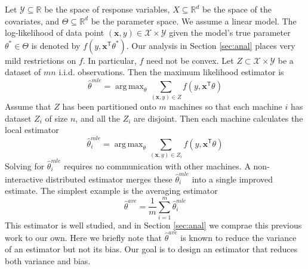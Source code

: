 \documentclass[twoside]{article}
\DeclareMathOperator*{\argmin}{arg\,min}
\DeclareMathOperator*{\argmax}{arg\,max}
\newcommand{\Q}{\mathcal{Q}}
\newcommand{\Y}{\mathcal{Y}}
\newcommand{\X}{\mathcal{X}}
\newcommand{\x}{\mathbf{x}}
\newcommand{\w}{\theta}
\newcommand{\wave}{\hat\w^{ave}}
\newcommand{\wmle}{\hat\w^{mle}}
\newcommand{\wstar}{{\w^{*}}}
\newcommand{\wq}{\hat\w^{q}}
\newcommand{\wqstar}{\hat\w^{q^*}}
\newcommand{\trans}[1]{\ensuremath{{#1}^{\mathsf{T}}}}
\newcommand{\ltwo}[1]{{\left\lVert {#1} \right\rVert}}
\begin{document}
Let $\Y\subseteq\mathbb{R}$ be the space of response variables,
$X\subseteq\mathbb{R}^d$ be the space of the covariates,
and $\Theta\subseteq\mathbb{R}^d$ be the parameter space.
We assume a linear model.
The log-likelihood of data point $(\x,y)\in\X\times\Y$ given the model's true parameter $\wstar\in\Theta$ is denoted by $f(y,\trans\x\wstar)$.
Our analysis in Section \ref{sec:anal} places very mild restrictions on $f$.
In particular, $f$ need not be convex.
Let $Z\subset\X\times\Y$ be a dataset of $mn$ i.i.d. observations.
Then the maximum likelihood estimator is
\begin{equation}
\wmle=\argmax_\w \sum_{(\x,y)\in Z} f(y,\trans\x\w)
\end{equation}
Assume that $Z$ has been partitioned onto $m$ machines so that each machine $i$ has dataset $Z_i$ of size $n$, and all the $Z_i$ are disjoint.
Then each machine calculates the local estimator
\begin{equation}
\wmle_i = \argmax_\w \sum_{(\x,y) \in Z_i} f(y,\trans\x\w)
\end{equation}
Solving for $\wmle_i$ requires no communication with other machines.
A non-interactive distributed estimator merges these $\wmle_i$ into a single improved estimate.
The simplest example is the averaging estimator
\begin{equation}
\wave = \frac{1}{m}\sum_{i=1}^m \wmle_i
\end{equation}
This estimator is well studied, and in Section \ref{sec:anal} we comprae this previous work to our own.
Here we briefly note that $\wave$ is known to reduce the variance of an estimator but not its bias.
Our goal is to design an estimator that reduces both variance and bias.

\end{document}
